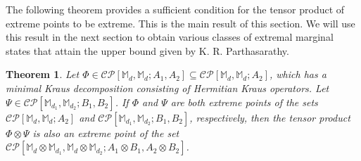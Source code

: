 \documentclass[10pt,reqno]{amsart}
\theoremstyle{definition}
\theoremstyle{plain}
\newtheorem{thm}[defn]{Theorem}
\theoremstyle{remark}
\newcommand{\mbb}[1]{\mathbb{#1}}
\newcommand{\msc}[1]{\mathscr{#1}}
\newcommand{\M}[1]{\mbb{M}_{#1}}%
\numberwithin{equation}{section}%
\begin{document}
   
   The following theorem provides a sufficient condition for the tensor product of extreme points to be extreme. This is the main result of this section. We will use this result in the next section to obtain various classes of extremal marginal states that attain the upper bound given by K. R. Parthasarathy. 
   
   
   
   \begin{thm}\label{thm-tensor product-extreme}
   	Let $\Phi\in\msc{CP}[\M{d},\M{d}; A_1, A_2]\subseteq \msc{CP}[\M{d},\M{d}; A_2]$, which has a minimal Kraus decomposition consisting of Hermitian Kraus operators. Let $\Psi\in\msc{CP}[\M{d_1},\M{d_2}; B_1, B_2]$. If $\Phi$ and $\Psi$ are both extreme points of the sets $\msc{CP}[\M{d},\M{d}; A_2]$ and $\msc{CP}[\M{d_1},\M{d_2}; B_1, B_2]$, respectively, then the tensor product $\Phi\otimes \Psi$ is also an extreme point of the set $\msc{CP}[\M{d}\otimes\M{d_1},\M{d}\otimes\M{d_2}; A_1\otimes B_1, A_2\otimes B_2]$.
   \end{thm}
   
   
   
\end{document}
